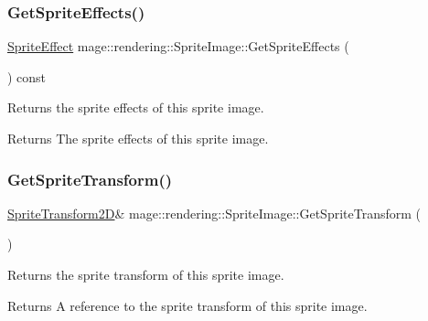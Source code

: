 \subsubsection{\texorpdfstring{Get\+Sprite\+Effects()}{GetSpriteEffects()}}
{\footnotesize\ttfamily \mbox{\hyperlink{namespacemage_1_1rendering_a4dbc3536c87b906f1d41d863ec458e78}{Sprite\+Effect}} mage\+::rendering\+::\+Sprite\+Image\+::\+Get\+Sprite\+Effects (\begin{DoxyParamCaption}{ }\end{DoxyParamCaption}) const\hspace{0.3cm}{\ttfamily [noexcept]}}

Returns the sprite effects of this sprite image.

\begin{DoxyReturn}{Returns}
The sprite effects of this sprite image. 
\end{DoxyReturn}
\mbox{\label{classmage_1_1rendering_1_1_sprite_image_a0deb8ced92c461e6744d9193464d2c28}} 
\subsubsection{\texorpdfstring{Get\+Sprite\+Transform()}{GetSpriteTransform()}\hspace{0.1cm}{\footnotesize\ttfamily [1/2]}}
{\footnotesize\ttfamily \mbox{\hyperlink{classmage_1_1_sprite_transform2_d}{Sprite\+Transform2D}}\& mage\+::rendering\+::\+Sprite\+Image\+::\+Get\+Sprite\+Transform (\begin{DoxyParamCaption}{ }\end{DoxyParamCaption})\hspace{0.3cm}{\ttfamily [noexcept]}}

Returns the sprite transform of this sprite image.

\begin{DoxyReturn}{Returns}
A reference to the sprite transform of this sprite image. 
\end{DoxyReturn}
\mbox{\label{classmage_1_1rendering_1_1_sprite_image_add8c077e8682049e2a3de7b763b06ed9}} 
